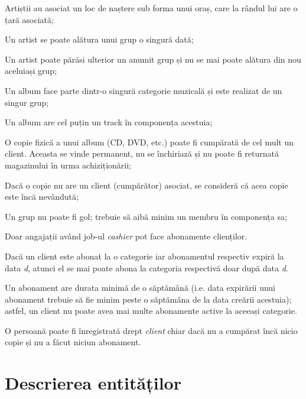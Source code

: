 \documentclass[a4paper, oneside, 12pt]{article}
\begin{document}
\begin{m_itemize}
        \item Artiștii au asociat un loc de naștere sub forma unui oraș, care
              la rândul lui are o țară asociată;
        \item Un artist se poate alătura unui grup o singură dată;
        \item Un artist poate părăsi ulterior un anumit grup și nu se mai poate
              alătura din nou aceluiași grup;
        \item Un album face parte dintr-o singură categorie muzicală și este
              realizat de un singur grup;
        \item Un album are cel puțin un track în componența acestuia;
        \item O copie fizică a unui album (CD, DVD, etc.) poate fi cumpărată de
              cel mult un client. Aceasta se vinde permanent, nu se
              închiriază și nu poate fi returnată magazinului în urma
              achiziționării;
        \item Dacă o copie nu are un client (cumpărător) asociat, se consideră
              că acea copie este încă nevândută;
        \item Un grup nu poate fi gol; trebuie să aibă minim un membru în
              componența sa;
        \item Doar angajații având job-ul \emph{cashier} pot face abonamente
              clienților.
        \item Dacă un client este abonat la o categorie iar abonamentul
              respectiv expiră la data \emph{d}, atunci el se mai poate abona
              la categoria respectivă doar după data \emph{d}.
        \item Un abonament are durata minimă de o săptămână (i.e. data
              expirării unui abonament trebuie să fie minim peste o săptămâna
              de la data creării acestuia); astfel, un client nu poate avea
              mai multe abonamente active la aceeași categorie.
        \item O persoană poate fi înregistrată drept \emph{client} chiar dacă nu
              a cumpărat încă nicio copie și nu a făcut niciun abonament.

\end{m_itemize}

\section{Descrierea entităților}
\end{document}
